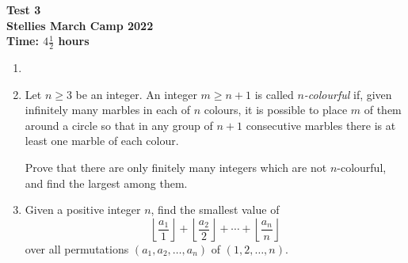 \documentclass{article}
\begin{document}
\thispagestyle{empty}

\begin{center}
  \textbf{\Large Test 3}
  \\ \vspace{1em}
  \textbf{\large Stellies March Camp 2022}
  \\ \vspace{1em}
  \textbf{\large Time: $4\frac{1}{2}$ hours}
\end{center}

\vspace{24pt}

\begin{enumerate}[itemsep=12pt]

\item %


\item %
Let $n \geq 3$ be an integer.
An integer $m \geq n+1$ is called \emph{$n$-colourful} if, given infinitely many marbles in each of $n$ colours, it is possible to place $m$ of them around a circle so that in any group of $n+1$ consecutive marbles there is at least one marble of each colour.

Prove that there are only finitely many integers which are not $n$-colourful, and find the largest among them.

\item %
\newcommand{\floorf}[2]{\left\lfloor\frac{#1}{#2}\right\rfloor}
Given a positive integer $n$, find the smallest value of
\[ \floorf{a_1}{1} +\floorf{a_2}{2} +\dotsb +\floorf{a_n}{n} \]
over all permutations $(a_1, a_2, \dotsc, a_n)$ of $(1, 2, \dotsc, n)$.

\end{enumerate}

\vfill
\centering
\begin{BVerbatim}
\end{BVerbatim}
\end{document}
